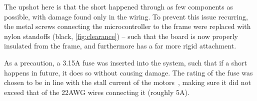 \documentclass[main.tex]{subfiles}
\begin{document}
	The upshot here is that the short happened through as few components as possible, with damage found only in the wiring. To prevent this issue recurring, the metal screws connecting the microcontroller to the frame were replaced with nylon standoffs (black, \cref{fig:clearance}) -- such that the board is now properly insulated from the frame, and furthermore has a far more rigid attachment.

	As a precaution, a 3.15A fuse was inserted into the system, such that if a short happens in future, it does so without causing damage. The rating of the fuse was chosen to be in line with the stall current of the motors~\cite{motor}, making sure it did not exceed that of the 22AWG wires connecting it (roughly 5A).




\bib
\end{document}
